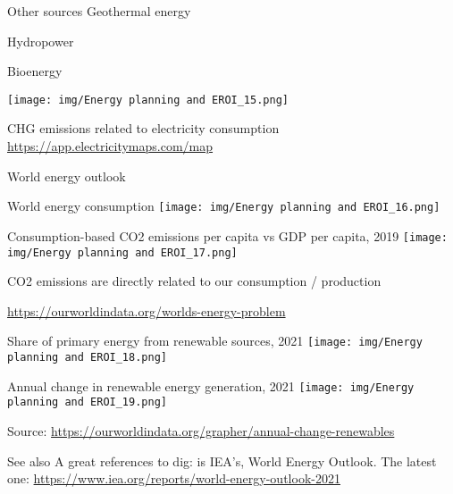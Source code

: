 \begin{frame}{Other sources}
\label{other-sources}
Geothermal energy

Hydropower

Bioenergy

\texttt{[image: img/Energy planning and EROI\_15.png]}
\end{frame}

\begin{frame}{CHG emissions related to electricity consumption}
\label{chg-emissions-related-to-electricity-consumption}
\url{https://app.electricitymaps.com/map}
\end{frame}

\begin{frame}{World energy outlook}
\label{world-energy-outlook}
\end{frame}

\begin{frame}{World energy consumption}
\label{world-energy-consumption}
\texttt{[image: img/Energy planning and EROI\_16.png]}
\end{frame}

\begin{frame}{Consumption-based CO2 emissions per capita vs GDP per
capita, 2019}
\label{consumption-based-co2-emissions-per-capita-vs-gdp-per-capita-2019}
\texttt{[image: img/Energy planning and EROI\_17.png]}

CO2 emissions are directly related to our consumption / production

\url{https://ourworldindata.org/worlds-energy-problem}
\end{frame}

\begin{frame}{Share of primary energy from renewable sources, 2021}
\label{share-of-primary-energy-from-renewable-sources-2021}
\texttt{[image: img/Energy planning and EROI\_18.png]}
\end{frame}

\begin{frame}{Annual change in renewable energy generation, 2021}
\label{annual-change-in-renewable-energy-generation-2021}
\texttt{[image: img/Energy planning and EROI\_19.png]}

Source:
\url{https://ourworldindata.org/grapher/annual-change-renewables}
\end{frame}

\begin{frame}{See also}
\label{see-also}
A great references to dig: is IEA's, World Energy Outlook. The latest
one: \url{https://www.iea.org/reports/world-energy-outlook-2021}
\end{frame}

